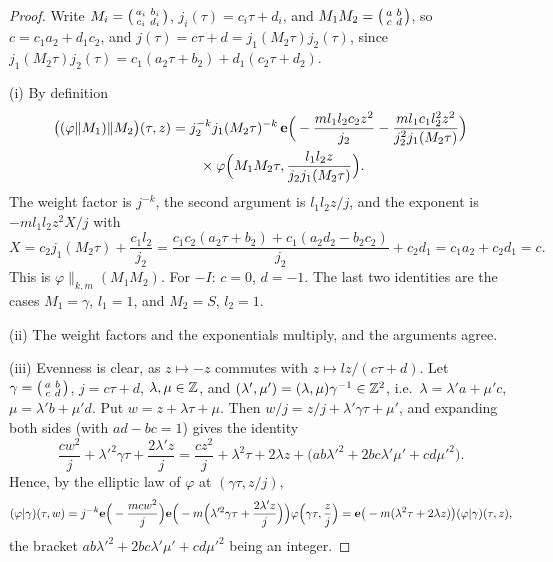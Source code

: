 \begin{proof}
Write $M_i=\begin{psmallmatrix}a_i&b_i\\c_i&d_i\end{psmallmatrix}$, $j_i(\tau)=c_i\tau+d_i$, and $M_1M_2=\begin{psmallmatrix}a&b\\c&d\end{psmallmatrix}$, so $c=c_1a_2+d_1c_2$, and $j(\tau)=c\tau+d=j_1(M_2\tau)j_2(\tau)$, since $j_1(M_2\tau)j_2(\tau)=c_1(a_2\tau+b_2)+d_1(c_2\tau+d_2)$.

(i) By definition
\[
\begin{aligned}
\big((\varphi\|M_1)\|M_2\big)(\tau,z)&=j_2^{-k}j_1(M_2\tau)^{-k}\,\mathbf e\Big(-\frac{ml_1l_2c_2z^2}{j_2}-\frac{ml_1c_1l_2^2z^2}{j_2^2j_1(M_2\tau)}\Big)\\
&\qquad\times\varphi\Big(M_1M_2\tau,\frac{l_1l_2z}{j_2j_1(M_2\tau)}\Big).
\end{aligned}
\]
The weight factor is $j^{-k}$, the second argument is $l_1l_2z/j$, and the exponent is $-ml_1l_2z^2X/j$ with
\[
X=c_2j_1(M_2\tau)+\frac{c_1l_2}{j_2}=\frac{c_1c_2(a_2\tau+b_2)+c_1(a_2d_2-b_2c_2)}{j_2}+c_2d_1=c_1a_2+c_2d_1=c.
\] This is $\varphi\|_{k,m}(M_1M_2)$. For $-I$: $c=0$, $d=-1$. The last two identities are the cases $M_1=\gamma$, $l_1=1$, and $M_2=S$, $l_2=1$.

(ii) The weight factors and the exponentials multiply, and the arguments agree.

(iii) Evenness is clear, as $z\mapsto-z$ commutes with $z\mapsto lz/(c\tau+d)$. Let $\gamma=\begin{psmallmatrix}a&b\\c&d\end{psmallmatrix}$, $j=c\tau+d$, $\lambda,\mu\in\mathbb{Z}$, and $(\lambda',\mu')=(\lambda,\mu)\gamma^{-1}\in\mathbb{Z}^2$, i.e.\ $\lambda=\lambda'a+\mu'c$, $\mu=\lambda'b+\mu'd$. Put $w=z+\lambda\tau+\mu$. Then $w/j=z/j+\lambda'\gamma\tau+\mu'$, and expanding both sides (with $ad-bc=1$) gives the identity
\[
\frac{cw^2}j+\lambda'^2\gamma\tau+\frac{2\lambda'z}j=\frac{cz^2}j+\lambda^2\tau+2\lambda z+\big(ab\lambda'^2+2bc\lambda'\mu'+cd\mu'^2\big).
\]
Hence, by the elliptic law of $\varphi$ at $(\gamma\tau,z/j)$,
\[
(\varphi|\gamma)(\tau,w)=j^{-k}\mathbf e\Big(-\frac{mcw^2}j\Big)\mathbf e\Big(-m\Big(\lambda'^2\gamma\tau+\frac{2\lambda'z}j\Big)\Big)\varphi\Big(\gamma\tau,\frac zj\Big)=\mathbf e\big(-m(\lambda^2\tau+2\lambda z)\big)(\varphi|\gamma)(\tau,z),
\]
the bracket $ab\lambda'^2+2bc\lambda'\mu'+cd\mu'^2$ being an integer.
\end{proof}

